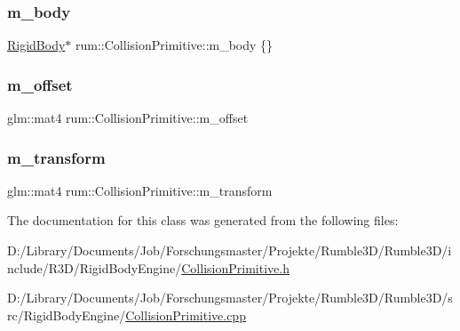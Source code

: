 \subsubsection{\texorpdfstring{m\+\_\+body}{m\_body}}
{\footnotesize\ttfamily \mbox{\hyperlink{classrum_1_1_rigid_body}{Rigid\+Body}}$\ast$ rum\+::\+Collision\+Primitive\+::m\+\_\+body \{\}\hspace{0.3cm}{\ttfamily [protected]}}

\mbox{\label{classrum_1_1_collision_primitive_a1617f197d7dbf54801bb21fbcedf730e}} 
\subsubsection{\texorpdfstring{m\+\_\+offset}{m\_offset}}
{\footnotesize\ttfamily glm\+::mat4 rum\+::\+Collision\+Primitive\+::m\+\_\+offset\hspace{0.3cm}{\ttfamily [protected]}}

\mbox{\label{classrum_1_1_collision_primitive_a17dea68b6d2faa8573935fbaf4e81440}} 
\subsubsection{\texorpdfstring{m\+\_\+transform}{m\_transform}}
{\footnotesize\ttfamily glm\+::mat4 rum\+::\+Collision\+Primitive\+::m\+\_\+transform\hspace{0.3cm}{\ttfamily [protected]}}



The documentation for this class was generated from the following files\+:\begin{DoxyCompactItemize}
\item 
D\+:/\+Library/\+Documents/\+Job/\+Forschungsmaster/\+Projekte/\+Rumble3\+D/\+Rumble3\+D/include/\+R3\+D/\+Rigid\+Body\+Engine/\mbox{\hyperlink{_collision_primitive_8h}{Collision\+Primitive.\+h}}\item 
D\+:/\+Library/\+Documents/\+Job/\+Forschungsmaster/\+Projekte/\+Rumble3\+D/\+Rumble3\+D/src/\+Rigid\+Body\+Engine/\mbox{\hyperlink{_collision_primitive_8cpp}{Collision\+Primitive.\+cpp}}\end{DoxyCompactItemize}
